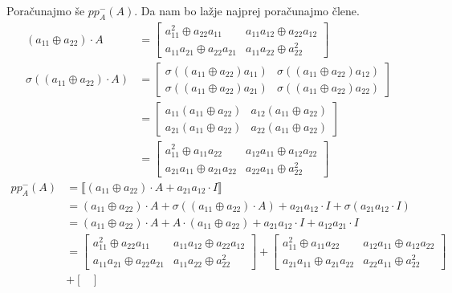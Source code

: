 \documentclass[mat1]{fmfdelo}
\begin{document}
\begin{zgled}
Poračunajmo še $pp_A^{-}(A)$. Da nam bo lažje najprej poračunajmo člene.
\begin{align*}
	(a_{11} \oplus a_{22})\cdot A &= \begin{bmatrix}
		a_{11}^2 \oplus a_{22}a_{11} & a_{11}a_{12} \oplus a_{22}a_{12} \\
		a_{11}a_{21} \oplus a_{22}a_{21} & a_{11}a_{22} \oplus a_{22}^2
	\end{bmatrix} \\
\sigma((a_{11} \oplus a_{22})\cdot A) &= \begin{bmatrix}
	\sigma((a_{11} \oplus a_{22})a_{11}) & \sigma((a_{11} \oplus a_{22})a_{12}) \\
	\sigma((a_{11} \oplus a_{22})a_{21}) & \sigma((a_{11} \oplus a_{22})a_{22})
\end{bmatrix} \\ &= \begin{bmatrix}
	a_{11}(a_{11} \oplus a_{22}) & a_{12}(a_{11} \oplus a_{22}) \\
	a_{21}(a_{11} \oplus a_{22}) & a_{22}(a_{11} \oplus a_{22})
\end{bmatrix} \\ &= \begin{bmatrix}
	a_{11}^2 \oplus a_{11}a_{22} & a_{12}a_{11} \oplus a_{12}a_{22} \\
	a_{21}a_{11} \oplus a_{21}a_{22} & a_{22}a_{11} \oplus a_{22}^2
\end{bmatrix}
\end{align*}
\begin{align*}
	pp_A^{-}(A) &= \llbracket (a_{11} \oplus a_{22})\cdot A + a_{21}a_{12}\cdot I \rrbracket \\ &= (a_{11} \oplus a_{22})\cdot A + \sigma((a_{11} \oplus a_{22})\cdot A) + a_{21}a_{12}\cdot I + \sigma(a_{21}a_{12}\cdot I) \\
	&= (a_{11} \oplus a_{22})\cdot A + A\cdot (a_{11} \oplus a_{22}) + a_{21}a_{12}\cdot I + a_{12}a_{21}\cdot I \\ &= \begin{bmatrix}
	a_{11}^2 \oplus a_{22}a_{11} & a_{11}a_{12} \oplus a_{22}a_{12} \\
	a_{11}a_{21} \oplus a_{22}a_{21} & a_{11}a_{22} \oplus a_{22}^2
\end{bmatrix} + \begin{bmatrix}
a_{11}^2 \oplus a_{11}a_{22} & a_{12}a_{11} \oplus a_{12}a_{22} \\
a_{21}a_{11} \oplus a_{21}a_{22} & a_{22}a_{11} \oplus a_{22}^2
\end{bmatrix}\\ &+ \begin{bmatrix}

\end{bmatrix}
\end{align*}
\end{zgled}
\end{document}
